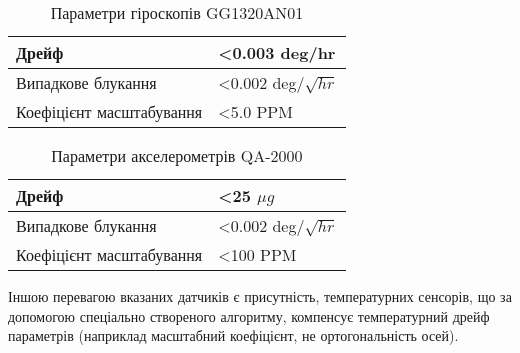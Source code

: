 \begin{table}[H]
\centering
\caption{Параметри гіроскопів GG1320AN01}
\begin{tabular}{|p{70mm}|p{40mm}|} \hline
Дрейф & <0.003 deg/hr \\ \hline 
Випадкове блукання &<0.002 deg/$\sqrt{hr}$  \\ \hline 
Коефіцієнт масштабування & <5.0 PPM  \\ \hline 
\end{tabular}
\label{tab:gyro_params}
\end{table}

\begin{table}[H]
\centering
\caption{Параметри акселерометрів QA-2000}
\begin{tabular}{|p{70mm}|p{40mm}|} \hline
Дрейф & <25 $\mu g$ \\ \hline 
Випадкове блукання &<0.002 deg/$\sqrt{hr}$  \\ \hline 
Коефіцієнт масштабування & <100 PPM  \\ \hline 
\end{tabular}
\label{tab:acc_params}
\end{table}

Іншою перевагою вказаних датчиків є присутність, температурних сенсорів, що за допомогою спеціально створеного алгоритму, компенсує температурний дрейф параметрів (наприклад масштабний коефіцієнт, не ортогональність осей). 